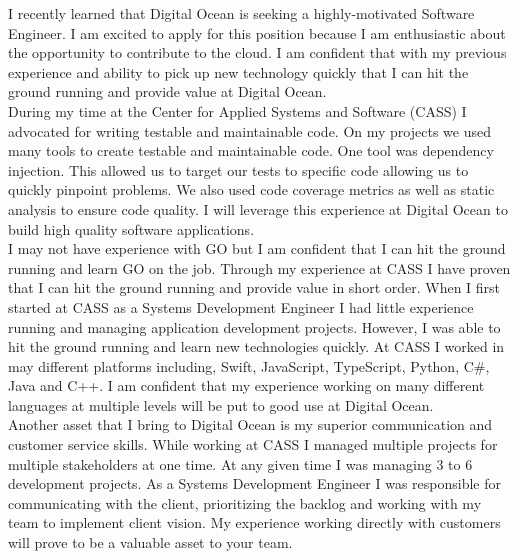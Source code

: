 \documentclass[11pt, a4paper]{awesome-cv}
\begin{document}
\makecvheader

\makelettertitle



\begin{cvletter}
    I recently learned that Digital Ocean is seeking a highly-motivated Software Engineer. I am excited to apply for this position because I am enthusiastic about the opportunity to contribute to the cloud. I am confident that with my previous experience and ability to pick up new technology quickly that I can hit the ground running and provide value at Digital Ocean.\\
    
    During my time at the Center for Applied Systems and Software (CASS) I advocated for writing testable and maintainable code. On my projects we used many tools to create testable and maintainable code. One tool was dependency injection. This allowed us to target our tests to specific code allowing us to quickly pinpoint problems. We also used code coverage metrics as well as static analysis to ensure code quality. I will leverage this experience at Digital Ocean to build high quality software applications.\\
    
    I may not have experience with GO but I am confident that I can hit the ground running and learn GO on the job. Through my experience at CASS I have proven that I can hit the ground running and provide value in short order. When I first started at CASS as a Systems Development Engineer I had little experience running and managing application development projects. However, I was able to hit the ground running and learn new technologies quickly. At CASS I worked in may different platforms including, Swift, JavaScript, TypeScript, Python, C\#, Java and C++. I am confident that my experience working on many different languages at multiple levels will be put to good use at Digital Ocean.\\ 
    
    Another asset that I bring to Digital Ocean is my superior communication and customer service skills. While working at CASS I managed multiple projects for multiple stakeholders at one time. At any given time I was managing 3 to 6 development projects. As a Systems Development Engineer I was responsible for communicating with the client, prioritizing the backlog and working with my team to implement client vision. My experience working directly with customers will prove to be a valuable asset to your team.\\ 
    

\end{cvletter}
\end{document}
